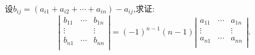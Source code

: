 \documentclass[../../main.tex]{subfiles}%
\begin{document}
\begin{example}
设$b_{ij}=\left( a_{i1}+a_{i2}+\cdots +a_{in} \right) -a_{ij}$,求证:
\begin{equation}
\left| \begin{matrix}
b_{11}&		\cdots&		b_{1n}\\
\vdots&		&		\vdots\\
b_{n1}&		\cdots&		b_{nn}\\
\end{matrix} \right|=(-1)^{n-1}(n-1)\left| \begin{matrix}
a_{11}&		\cdots&		a_{1n}\\
\vdots&		&		\vdots\\
a_{n1}&		\cdots&		a_{nn}\\
\end{matrix} \right|.
\nonumber
\end{equation}
\begin{solution}


\end{solution}
\end{example}
\end{document}
